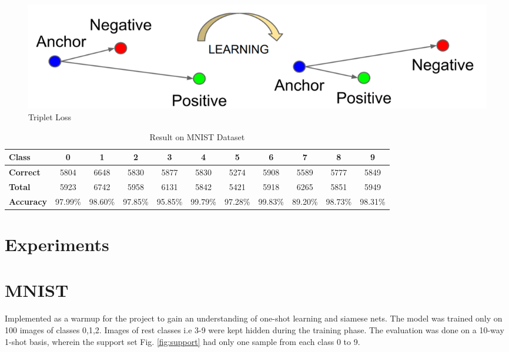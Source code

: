 \documentclass[aps,prb,twocolumn,superscriptaddress,floatfix,longbibliography, nofootinbib]{revtex4-2}
\begin{document}
 \begin{figure}[h]
    \includegraphics[clip=true,width=\columnwidth]{Tripletloss.png}
    \caption{Triplet Loss} 
     \label{fig:tripletloss}
\end{figure}

\begin{table}[t]
    \centering
    \begin{center}
    \caption{Result on MNIST Dataset}
    \label{tab:mnsit}
    \begin{tabular}{l|cccccccccc}
    \hline
    \textbf{Class}    & 0       & 1       & 2       & 3       & 4       & 5       & 6       & 7       & 8       & 9       \\
    \hline \hline
    \textbf{Correct}  & 5804    & 6648    & 5830    & 5877    & 5830    & 5274    & 5908    & 5589    & 5777    & 5849    \\
    \textbf{Total}    & 5923    & 6742    & 5958    & 6131    & 5842    & 5421    & 5918    & 6265    & 5851    & 5949    \\
    \textbf{Accuracy} & 97.99\% & 98.60\% & 97.85\% & 95.85\% & 99.79\% & 97.28\% & 99.83\% & 89.20\% & 98.73\% & 98.31\%\\
    \hline
    \end{tabular}
    \end{center}
\end{table}

\section{\label{sec:Experiments}Experiments}
\section{\label{sec:MNIST}MNIST}
Implemented as a warmup for the project to gain an understanding of one-shot learning and siamese nets.
The model was trained only on 100 images of classes 0,1,2. Images of rest classes i.e 3-9 were kept hidden during the training phase.
The evaluation was done on a 10-way 1-shot basis, wherein the support set Fig. \ref{fig:support} had only one sample from each class 0 to 9.
\end{document}
